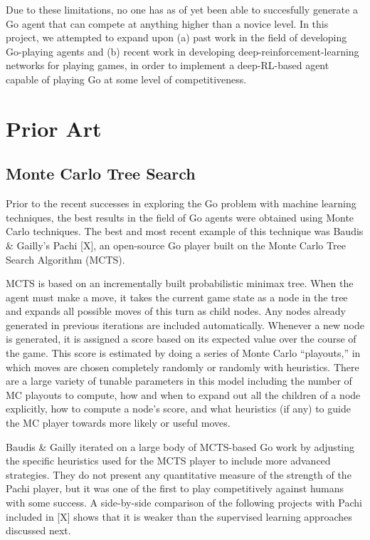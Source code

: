 Due to these limitations, no one has as of yet been able to succesfully generate a Go agent that can compete at anything higher than a novice level. In this project, we attempted to expand upon (a) past work in the field of developing Go-playing agents and (b) recent work in developing deep-reinforcement-learning networks for playing games, in order to implement a deep-RL-based agent capable of playing Go at some level of competitiveness.

\section{Prior Art}
\label{gen_inst}

\subsection*{Monte Carlo Tree Search}
Prior to the recent successes in exploring the Go problem with machine learning techniques, the best results in the field of Go agents were obtained using Monte Carlo techniques. The best and most recent example of this technique was Baudis \& Gailly's Pachi [X], an open-source Go player built on the Monte Carlo Tree Search Algorithm (MCTS).

MCTS is based on an incrementally built probabilistic minimax tree. When the agent must make a move, it takes the current game state as a node in the tree and expands all possible moves of this turn as child nodes. Any nodes already generated in previous iterations are included automatically. Whenever a new node is generated, it is assigned a score based on its expected value over the course of the game. This score is estimated by doing a series of Monte Carlo ``playouts,'' in which moves are chosen completely randomly or randomly with heuristics. There are a large variety of tunable parameters in this model including the number of MC playouts to compute, how and when to expand out all the children of a node explicitly, how to compute a node's score, and what heuristics (if any) to guide the MC player towards more likely or useful moves.

Baudis \& Gailly iterated on a large body of MCTS-based Go work by adjusting the specific heuristics used for the MCTS player to include more advanced strategies. They do not present any quantitative measure of the strength of the Pachi player, but it was one of the first to play competitively against humans with some success. A side-by-side comparison of the following projects with Pachi included in [X] shows that it is weaker than the supervised learning approaches discussed next.


